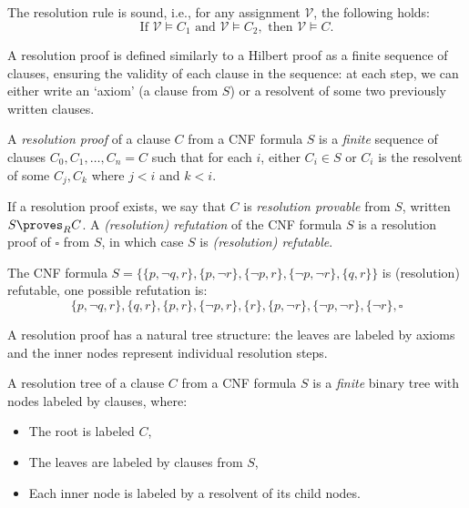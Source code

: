 \begin{observation}
The resolution rule is sound, i.e., for any assignment $\mathcal{V}$, the following holds:
$$
\text{If } \mathcal{V} \models C_1 \text{ and } \mathcal{V} \models C_2, \text{ then } \mathcal{V} \models C.
$$
\end{observation}

A resolution proof is defined similarly to a Hilbert proof as a finite sequence of clauses, ensuring the validity of each clause in the sequence: at each step, we can either write an `axiom' (a clause from $S$) or a resolvent of some two previously written clauses.

\begin{definition}
    A \emph{resolution proof} of a clause $C$ from a CNF formula $S$ is a \emph{finite} sequence of clauses $C_0, C_1, \dots, C_n = C$ such that for each $i$, either $C_i \in S$ or $C_i$ is the resolvent of some $C_j, C_k$ where $j < i$ and $k < i$.

    If a resolution proof exists, we say that $C$ is \emph{resolution provable} from $S$, written $S \proves_R C$. A \emph{(resolution) refutation} of the CNF formula $S$ is a resolution proof of $\square$ from $S$, in which case $S$ is \emph{(resolution) refutable}.
\end{definition}

\begin{example}\label{example:resolution-proof}
    The CNF formula $S = \{\{p, \neg q, r\}, \{p, \neg r\}, \{\neg p, r\}, \{\neg p, \neg r\}, \{q, r\}\}$ is (resolution) refutable, one possible refutation is:
    $$
    \{p, \neg q, r\}, \{q, r\}, \{p, r\}, \{\neg p, r\}, \{r\}, \{p, \neg r\}, \{\neg p, \neg r\}, \{\neg r\}, \square
    $$
\end{example}

A resolution proof has a natural tree structure: the leaves are labeled by axioms and the inner nodes represent individual resolution steps.

\begin{definition}
A resolution tree of a clause $C$ from a CNF formula $S$ is a \emph{finite} binary tree with nodes labeled by clauses, where:
\begin{itemize}
    \item The root is labeled $C$,
    \item The leaves are labeled by clauses from $S$,
    \item Each inner node is labeled by a resolvent of its child nodes.
\end{itemize}    
\end{definition}


